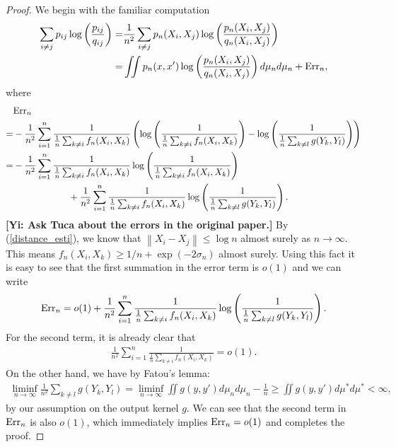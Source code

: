 \documentclass[10pt]{article}
\newcommand{\norm}[1]{\left\lVert#1\right\rVert}
\newcommand{\gy}[1]{\textbf{\color{gred}[Yi: #1]}}
\newenvironment{Proof of lemma}{\noindent{\bf Proof of Lemma}}{\hfill$\Box$\newline}
\newenvironment{Proof of claim}{\noindent{\bf Proof of claim}}{\hfill$\Box$\newline}
\newenvironment{Proof of theorem}{\noindent{\bf Proof of Theorem}}{\hfill\scriptsize{$\Box$}\newline}
\newenvironment{Proof of theorems}{\noindent{\bf Proof of Theorems}}{\hfill$\Box$\newline}
\newenvironment{Proof of proposition}{\noindent{\bf Proof of Proposition}}{\hfill$\Box$\newline}
\newenvironment{Proof of propositions}{\noindent{\bf Proof of Propositions}}{\hfill$\Box$\newline}
\newenvironment{Proof of exercise}{\noindent{\it Proof of Exercise:}}{\hfill$\Box$}
\numberwithin{equation}{section}
\begin{document}
\begin{proof}
    We begin with the familiar computation
    \begin{align}
        \sum_{i \neq j} p_{ij} \log \left(\frac{p_{ij}}{q_{ij}}\right) = & \frac{1}{n^2}\sum_{i \neq j}p_n(X_i,X_j) \log \left(\frac{p_n(X_i,X_j)}{q_n(X_i,X_j)}\right) \nonumber          \\
        =                                                                & \iint p_n(x,x') \log \left(\frac{p_n(X_i,X_j)}{q_n(X_i,X_j)}\right) d \mu_n d \mu_n + \text{\normalfont Err}_n,
    \end{align}
    where
    \begin{align}
          & \text{\normalfont Err}_n \nonumber                                                                                                                                                                                                   \\
        = & -\frac{1}{n^2}\sum_{i=1}^n\frac{1}{\frac{1}{n}\sum_{k \neq i}f_n(X_i,X_k)}\left(\log \left(\frac{1}{\frac{1}{n}\sum_{k \neq i}f_n(X_i,X_k)}\right)-\log \left(\frac{1}{\frac{1}{n}\sum_{k \neq l}g(Y_k,Y_l)}\right)\right) \nonumber \\
        = & -\frac{1}{n^2}\sum_{i=1}^n\frac{1}{\frac{1}{n}\sum_{k \neq i}f_n(X_i,X_k)}\log \left(\frac{1}{\frac{1}{n}\sum_{k \neq i}f_n(X_i,X_k)}\right) \nonumber                                                                               \\
          & \qquad \qquad \qquad + \frac{1}{n^2}\sum_{i=1}^n\frac{1}{\frac{1}{n}\sum_{k \neq i}f_n(X_i,X_k)}\log \left(\frac{1}{\frac{1}{n}\sum_{k \neq l}g(Y_k,Y_l)}\right).
    \end{align}
    \gy{Ask Tuca about the errors in the original paper.} By (\ref{distance_esti}), we know that $\norm{X_i - X_j} \leq \log n$ almost surely as $n \to \infty$. This means $f_n(X_i,X_k) \geq 1/n + \exp(-2\sigma_n)$ almost surely. Using this fact it is easy to see that the first summation in the error term is $o(1)$ and we can write
    \begin{align}
        \text{\normalfont Err}_n = o(1) + \frac{1}{n^2}\sum_{i=1}^n\frac{1}{\frac{1}{n}\sum_{k \neq i}f_n(X_i,X_k)}\log \left(\frac{1}{\frac{1}{n}\sum_{k \neq l}g(Y_k,Y_l)}\right).
    \end{align}
    For the second term, it is already clear that
    \begin{align}
        \frac{1}{n^2}\sum_{i=1}^n\frac{1}{\frac{1}{n}\sum_{k \neq i}f_n(X_i,X_k)} = o(1).
    \end{align}
    On the other hand, we have by Fatou's lemma:
    \begin{align}
        \liminf_{n \to \infty}\frac{1}{n^2} \sum_{k \neq l}g(Y_k,Y_l) = \liminf_{n \to \infty} \iint g(y,y') d\mu_n d\mu_n - \frac{1}{n} \geq \iint g(y,y') d\mu^* d\mu^* < \infty,
    \end{align}
    by our assumption on the output kernel $g$. We can see that the second term in $\text{\normalfont Err}_n$ is also $o(1)$, which immediately implies $\text{\normalfont Err}_n = o(1)$ and completes the proof.
\end{proof}
\end{document}
